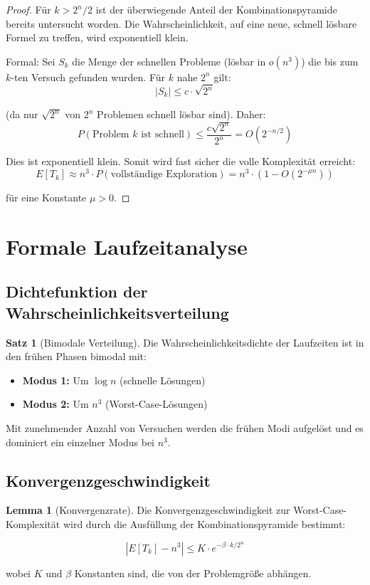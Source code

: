 ﻿\documentclass[a4paper,12pt]{article}
\theoremstyle{definition}
\newtheorem{satz}{Satz}
\newtheorem{lemma}{Lemma}
\begin{document}
\begin{proof}
Für $k > 2^n / 2$ ist der überwiegende Anteil der Kombinationspyramide bereits untersucht worden. Die Wahrscheinlichkeit, auf eine neue, schnell lösbare Formel zu treffen, wird exponentiell klein.

Formal: Sei $S_k$ die Menge der schnellen Probleme (lösbar in $o(n^3)$) die bis zum $k$-ten Versuch gefunden wurden. Für $k$ nahe $2^n$ gilt:
\[
|S_k| \leq c \cdot \sqrt{2^n}
\]

(da nur $\sqrt{2^n}$ von $2^n$ Problemen schnell lösbar sind). Daher:
\[
P(\text{Problem } k \text{ ist schnell}) \leq \frac{c \sqrt{2^n}}{2^n} = O(2^{-n/2})
\]

Dies ist exponentiell klein. Somit wird fast sicher die volle Komplexität erreicht:
\[
E[T_k] \approx n^3 \cdot P(\text{vollständige Exploration}) = n^3 \cdot (1 - O(2^{-\mu n}))
\]

für eine Konstante $\mu > 0$.
\end{proof}

\section{Formale Laufzeitanalyse}

\subsection{Dichtefunktion der Wahrscheinlichkeitsverteilung}

\begin{satz}[Bimodale Verteilung]
Die Wahrscheinlichkeitsdichte der Laufzeiten ist in den frühen Phasen bimodal mit:
\begin{itemize}
	\item \textbf{Modus 1:} Um $\log n$ (schnelle Lösungen)
	\item \textbf{Modus 2:} Um $n^3$ (Worst-Case-Lösungen)
\end{itemize}

Mit zunehmender Anzahl von Versuchen werden die frühen Modi aufgelöst und es dominiert ein einzelner Modus bei $n^3$.
\end{satz}

\subsection{Konvergenzgeschwindigkeit}

\begin{lemma}[Konvergenzrate]
Die Konvergenzgeschwindigkeit zur Worst-Case-Komplexität wird durch die Ausfüllung der Kombinationspyramide bestimmt:

\[
\left| E[T_k] - n^3 \right| \leq K \cdot e^{-\beta \cdot k / 2^n}
\]

wobei $K$ und $\beta$ Konstanten sind, die von der Problemgröße abhängen.
\end{lemma}
\end{document}
